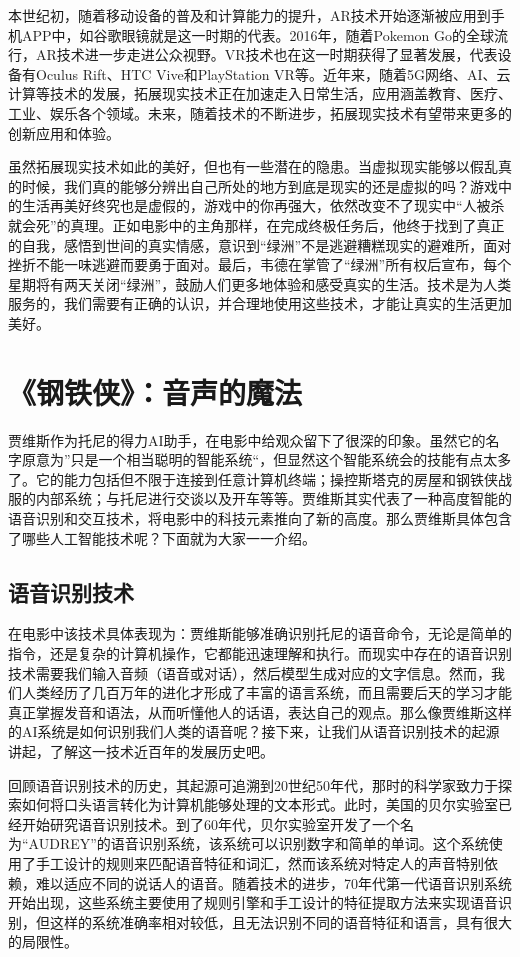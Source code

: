本世纪初，随着移动设备的普及和计算能力的提升，AR技术开始逐渐被应用到手机APP中，如谷歌眼镜就是这一时期的代表。2016年，随着Pokemon Go的全球流行，AR技术进一步走进公众视野。VR技术也在这一时期获得了显著发展，代表设备有Oculus Rift、HTC Vive和PlayStation VR等。近年来，随着5G网络、AI、云计算等技术的发展，拓展现实技术正在加速走入日常生活，应用涵盖教育、医疗、工业、娱乐各个领域。未来，随着技术的不断进步，拓展现实技术有望带来更多的创新应用和体验。

虽然拓展现实技术如此的美好，但也有一些潜在的隐患。当虚拟现实能够以假乱真的时候，我们真的能够分辨出自己所处的地方到底是现实的还是虚拟的吗？游戏中的生活再美好终究也是虚假的，游戏中的你再强大，依然改变不了现实中“人被杀就会死”的真理。正如电影中的主角那样，在完成终极任务后，他终于找到了真正的自我，感悟到世间的真实情感，意识到“绿洲”不是逃避糟糕现实的避难所，面对挫折不能一味逃避而要勇于面对。最后，韦德在掌管了“绿洲”所有权后宣布，每个星期将有两天关闭“绿洲”，鼓励人们更多地体验和感受真实的生活。技术是为人类服务的，我们需要有正确的认识，并合理地使用这些技术，才能让真实的生活更加美好。

\section{《钢铁侠》：音声的魔法}

贾维斯作为托尼的得力AI助手，在电影中给观众留下了很深的印象。虽然它的名字原意为”只是一个相当聪明的智能系统“，但显然这个智能系统会的技能有点太多了。它的能力包括但不限于连接到任意计算机终端；操控斯塔克的房屋和钢铁侠战服的内部系统；与托尼进行交谈以及开车等等。贾维斯其实代表了一种高度智能的语音识别和交互技术，将电影中的科技元素推向了新的高度。那么贾维斯具体包含了哪些人工智能技术呢？下面就为大家一一介绍。

\subsection{语音识别技术}

在电影中该技术具体表现为：贾维斯能够准确识别托尼的语音命令，无论是简单的指令，还是复杂的计算机操作，它都能迅速理解和执行。而现实中存在的语音识别技术需要我们输入音频（语音或对话），然后模型生成对应的文字信息。然而，我们人类经历了几百万年的进化才形成了丰富的语言系统，而且需要后天的学习才能真正掌握发音和语法，从而听懂他人的话语，表达自己的观点。那么像贾维斯这样的AI系统是如何识别我们人类的语音呢？接下来，让我们从语音识别技术的起源讲起，了解这一技术近百年的发展历史吧。

回顾语音识别技术的历史，其起源可追溯到20世纪50年代，那时的科学家致力于探索如何将口头语言转化为计算机能够处理的文本形式。此时，美国的贝尔实验室已经开始研究语音识别技术。到了60年代，贝尔实验室开发了一个名为“AUDREY”的语音识别系统，该系统可以识别数字和简单的单词。这个系统使用了手工设计的规则来匹配语音特征和词汇，然而该系统对特定人的声音特别依赖，难以适应不同的说话人的语音。随着技术的进步，70年代第一代语音识别系统开始出现，这些系统主要使用了规则引擎和手工设计的特征提取方法来实现语音识别，但这样的系统准确率相对较低，且无法识别不同的语音特征和语言，具有很大的局限性。

